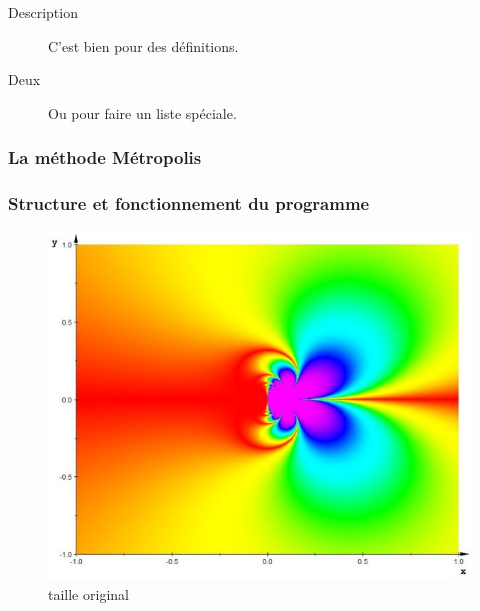 \begin{description}
\item[Description] C'est bien pour des définitions.
\item[Deux] Ou pour faire un liste spéciale.
\end{description}
\vspace{\parskip}

\subsubsection{La méthode Métropolis}

\subsubsection{Structure et fonctionnement du programme}

\begin{figure}[!ht]
    \center
    \includegraphics[]{./images/exemple.jpg}
    \caption{taille original}
    \label{Diagramme UML du programme}
\end{figure}
